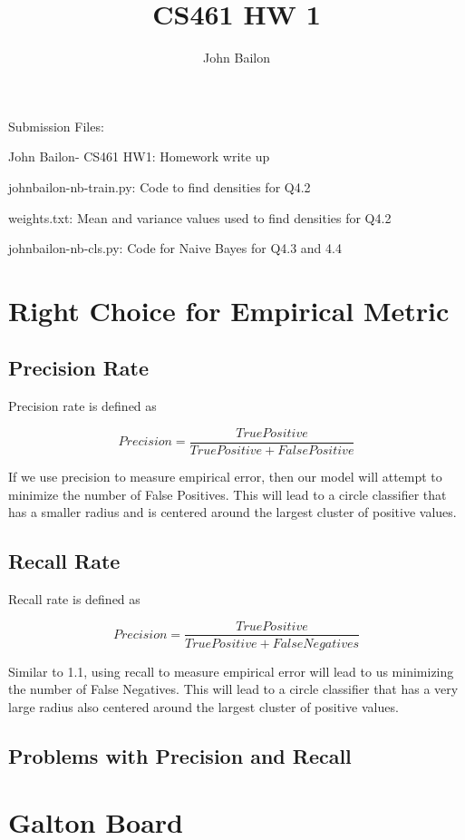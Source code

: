 \documentclass{article}
\title{CS461 HW 1}
\author{John Bailon}
\begin{document}
\maketitle

\noindent
Submission Files:

\noindent
John Bailon- CS461 HW1: Homework write up

\noindent
johnbailon-nb-train.py: Code to find densities for Q4.2

\noindent
weights.txt: Mean and variance values used to find densities for Q4.2

\noindent
johnbailon-nb-cls.py: Code for Naive Bayes for Q4.3 and 4.4 

\newpage
\section{Right Choice for Empirical Metric}

\subsection{Precision Rate}
Precision rate is defined as 

\[Precision = \frac{True Positive}{True Positive + False Positive}\]

\noindent
If we use precision to measure empirical error, then our model will attempt to minimize the number of False Positives. This will lead to a circle classifier that has a smaller radius and is centered around the largest cluster of positive values.


\subsection{Recall Rate}
Recall rate is defined as 

\[Precision = \frac{True Positive}{True Positive + False Negatives}\]

\noindent
Similar to 1.1, using recall to measure empirical error will lead to us minimizing the number of False Negatives. This will lead to a circle classifier that has a very large radius also centered around the largest cluster of positive values.

\subsection{Problems with Precision and Recall}

\newpage
\section{Galton Board}
\end{document}
